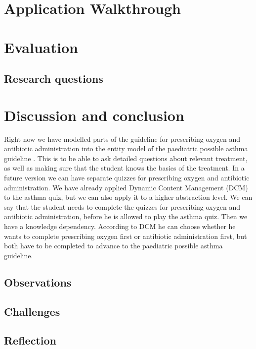 \documentclass[a4paper,12pt,oneside]{book}
\begin{document}
\chapter{Application Walkthrough}




\chapter{Evaluation}
\section{Research questions}




\chapter{Discussion and conclusion}
Right now we have modelled parts of the guideline for prescribing oxygen \parencite{RepublicofKeny2016} and antibiotic administration \parencite{RepublicofKeny2016} into the entity model of the paediatric possible asthma guideline \parencite{RepublicofKeny2016}. This is to be able to ask detailed questions about relevant treatment, as well as making sure that the student knows the basics of the treatment. In a future version we can have separate quizzes for prescribing oxygen and antibiotic administration. We have already applied Dynamic Content Management (DCM) to the asthma quiz, but we can also apply it to a higher abstraction level. We can say that the student needs to complete the quizzes for prescribing oxygen and antibiotic administration, before he is allowed to play the asthma quiz. Then we have a knowledge dependency. According to DCM he can choose whether he wants to complete prescribing oxygen first or antibiotic administration first, but both have to be completed to advance to the paediatric possible asthma guideline.

\section{Observations}
\section{Challenges}
\section{Reflection}
\end{document}
